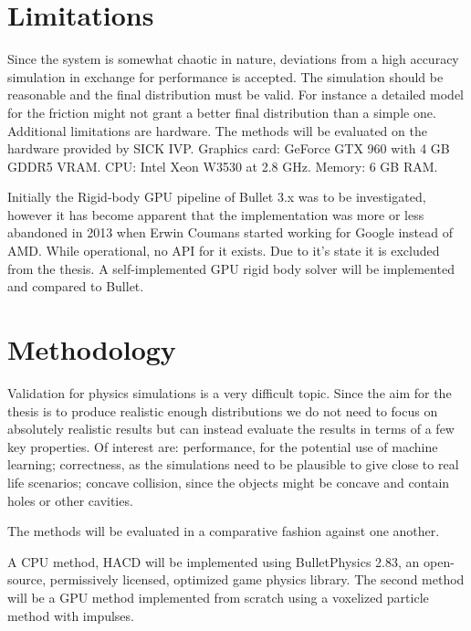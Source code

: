 \section{Limitations}
Since the system is somewhat chaotic in nature, deviations from a high accuracy
simulation in exchange for performance is accepted. The simulation should be reasonable
and the final distribution must be valid. For instance a detailed
model for the friction might not grant a better final distribution than a simple one.
Additional limitations are hardware. The methods will be evaluated on the hardware
provided by SICK IVP. Graphics card: GeForce GTX 960 with 4 GB GDDR5 VRAM.
CPU: Intel Xeon W3530 at 2.8 GHz.
Memory: 6 GB RAM.

Initially the Rigid-body GPU pipeline of Bullet 3.x was to be investigated, however
it has become apparent that the implementation was more or less abandoned in 2013
when Erwin Coumans started working for Google instead of AMD. While operational,
no API for it exists. Due to it's state it is excluded from the thesis.
A self-implemented GPU rigid body solver will be implemented and compared to Bullet.

\section{Methodology}
Validation for physics simulations is a very difficult topic. Since the aim for
the thesis is to produce realistic enough distributions we do not need to focus
on absolutely realistic results but can instead evaluate the results in terms of
a few key properties. Of interest are: performance, for the potential use of machine learning; correctness,
as the simulations need to be plausible to give close to real life scenarios; concave collision, since the objects might
 be concave and contain holes or other cavities.

The methods will be evaluated in a comparative fashion against one another.

A CPU method, HACD will be implemented using
BulletPhysics 2.83, an open-source, permissively licensed, optimized game physics
library. The second method will be a GPU method implemented from scratch using a
voxelized particle method with impulses.
